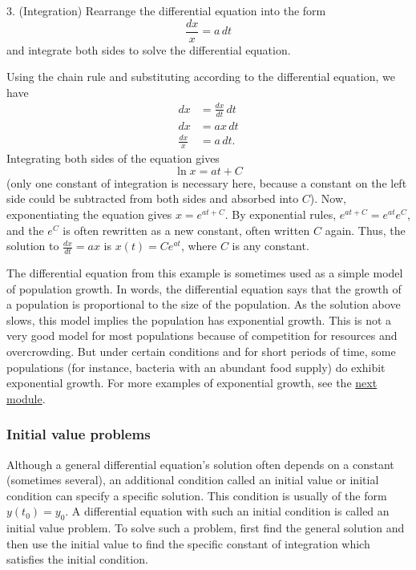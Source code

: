 \documentclass[twoside,openright,titlepage,a4paper]{book}
\begin{document}
\begin{sloppypar}
3. (Integration) Rearrange the differential equation into the form \[ \frac{dx}{x} = a \, dt \] and integrate both sides to solve the differential equation.
\begin{examplebox}
Using the chain rule and substituting according to the differential equation, we have
\begin{align*} 
dx &= \frac{dx}{dt} \, dt \\
dx &= a x \, dt \\
\frac{dx}{x} &= a \, dt. 
\end{align*}
Integrating both sides of the equation gives \[ \ln x = at+C \] (only one constant of integration is necessary here, because a constant on the left side could be subtracted from both sides and absorbed into $C$). Now, exponentiating the equation gives $x = e^{at+C}$. By exponential rules, $e^{at+C} = e^{at}e^C$, and the $e^C$ is often rewritten as a new constant, often written $C$ again.
Thus, the solution to $\frac{dx}{dt} = ax$ is $x(t) = Ce^{at}$, where $C$ is any constant.	
\end{examplebox}
	
The differential equation from this example is sometimes used as a simple model of population growth. In words, the differential equation says that the growth of a population is proportional to the size of the population. As the solution above slows, this model implies the population has exponential growth. This is not a very good model for most populations because of competition for resources and overcrowding. But under certain conditions and for short periods of time, some populations (for instance, bacteria with an abundant food supply) do exhibit exponential growth. For more examples of exponential growth, see the \hyperref[ChIntegrationSecExponentialGrowthExamples]{next module}.\\
	
\subsubsection{Initial value problems}

Although a general differential equation's solution often depends on a constant (sometimes several), an additional condition called an initial value or initial condition can specify a specific solution. This condition is usually of the form $y(t_0) = y_0$. A differential equation with such an initial condition is called an initial value problem. To solve such a problem, first find the general solution and then use the initial value to find the specific constant of integration which satisfies the initial condition.


\end{sloppypar}
\end{document}
